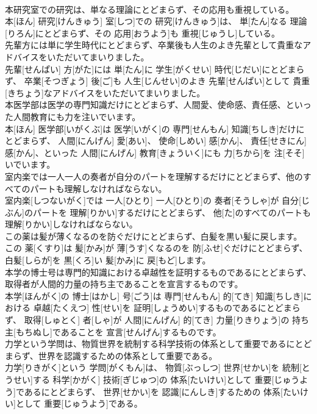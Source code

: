 \documentclass[8pt]{extreport}
\begin{document}
\begin{CJK}{UTF8}{min}
\\	本研究室での研究は、単なる理論にとどまらず、その応用も重視している。	
\\	本[ほん] 研究[けんきゅう] 室[しつ]での 研究[けんきゅう]は、 単[たん]なる 理論[りろん]にとどまらず、その 応用[おうよう]も 重視[じゅうし]している。
\\	先輩方には単に学生時代にとどまらず、卒業後も人生のよき先輩として貴重なアドバイスをいただいてまいりました。	
\\	先輩[せんぱい] 方[がた]には 単[たん]に 学生[がくせい] 時代[じだい]にとどまらず、 卒業[そつぎょう] 後[ご]も 人生[じんせい]のよき 先輩[せんぱい]として 貴重[きちょう]なアドバイスをいただいてまいりました。
\\	本医学部は医学の専門知識だけにとどまらず、人間愛、使命感、責任感、といった人間教育にも力を注いでいます。	
\\	本[ほん] 医学部[いがくぶ]は 医学[いがく]の 専門[せんもん] 知識[ちしき]だけにとどまらず、 人間[にんげん] 愛[あい]、 使命[しめい] 感[かん]、 責任[せきにん] 感[かん]、といった 人間[にんげん] 教育[きょういく]にも 力[ちから]を 注[そそ]いでいます。
\\	室内楽では一人一人の奏者が自分のパートを理解するだけにとどまらず、他のすべてのパートも理解しなければならない。	
\\	室内楽[しつないがく]では 一人[ひとり] 一人[ひとり]の 奏者[そうしゃ]が 自分[じぶん]のパートを 理解[りかい]するだけにとどまらず、 他[た]のすべてのパートも 理解[りかい]しなければならない。
\\	この薬は髪が薄くなるのを防ぐだけにとどまらず、白髪を黒い髪に戻します。	
\\	この 薬[くすり]は 髪[かみ]が 薄[うす]くなるのを 防[ふせ]ぐだけにとどまらず、 白髪[しらが]を 黒[くろ]い 髪[かみ]に 戻[もど]します。
\\	本学の博士号は専門的知識における卓越性を証明するものであるにとどまらず、取得者が人間的力量の持ち主であることを宣言するものです。	
\\	本学[ほんがく]の 博士[はかし] 号[ごう]は 専門[せんもん] 的[てき] 知識[ちしき]における 卓越[たくえつ] 性[せい]を 証明[しょうめい]するものであるにとどまらず、 取得[しゅとく] 者[しゃ]が 人間[にんげん] 的[てき] 力量[りきりょう]の 持ち主[もちぬし]であることを 宣言[せんげん]するものです。
\\	力学という学問は、物質世界を統制する科学技術の体系として重要であるにとどまらず、世界を認識するための体系として重要である。	
\\	力学[りきがく]という 学問[がくもん]は、 物質[ぶっしつ] 世界[せかい]を 統制[とうせい]する 科学[かがく] 技術[ぎじゅつ]の 体系[たいけい]として 重要[じゅうよう]であるにとどまらず、 世界[せかい]を 認識[にんしき]するための 体系[たいけい]として 重要[じゅうよう]である。

\end{CJK}
\end{document}
